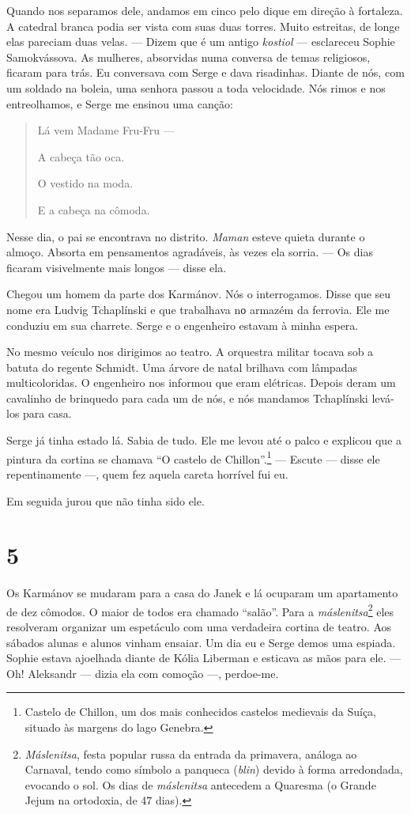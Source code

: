 Quando nos separamos dele, andamos em cinco pelo dique em direção à
fortaleza. A catedral branca podia ser vista com suas duas torres. Muito
estreitas, de longe elas pareciam duas velas. --- Dizem que é um antigo
\emph{kostiol} --- esclareceu Sophie Samokvássova. As mulheres,
absorvidas numa conversa de temas religiosos, ficaram para trás. Eu
conversava com Serge e dava risadinhas. Diante de nós, com um soldado na
boleia, uma senhora passou a toda velocidade. Nós rimos e nos
entreolhamos, e Serge me ensinou uma canção:

\begin{quotation}
Lá vem Madame Fru-Fru ---

A cabeça tão oca.

O vestido na moda.

E a cabeça na cômoda.
\end{quotation}

Nesse dia, o pai se encontrava no distrito. \emph{Maman} esteve quieta
durante o almoço. Absorta em pensamentos agradáveis, às vezes ela
sorria. --- Os dias ficaram visivelmente mais longos --- disse ela.

Chegou um homem da parte dos Karmánov. Nós o interrogamos. Disse que seu
nome era Ludvig Tchaplínski e que trabalhava nо armazém da ferrovia. Ele
me conduziu em sua charrete. Serge e o engenheiro estavam à minha
espera.

No mesmo veículo nos dirigimos ao teatro. A orquestra militar tocava sob
a batuta do regente Schmidt. Uma árvore de natal brilhava com lâmpadas
multicoloridas. O engenheiro nos informou que eram elétricas. Depois
deram um cavalinho de brinquedo para cada um de nós, e nós mandamos
Tchaplínski levá-los para casa.

Serge já tinha estado lá. Sabia de tudo. Ele me levou até o palco e
explicou que a pintura da cortina se chamava ``O castelo de
Chillon''.\footnote{Castelo de Chillon, um dos mais conhecidos castelos
  medievais da Suíça, situado às margens do lago Genebra.} --- Escute
--- disse ele repentinamente ---, quem fez aquela careta horrível fui
eu.

Em seguida jurou que não tinha sido ele.

\section{5}

Os Karmánov se mudaram para a casa do Janek e lá ocuparam um apartamento
de dez cômodos. O maior de todos era chamado ``salão''. Para a
\emph{máslenitsa}\footnote{\emph{Máslenitsa}, festa popular russa da
  entrada da primavera, análoga ao Carnaval, tendo como símbolo a
  panqueca (\emph{blin}) devido à forma arredondada, evocando o sol. Os
  dias de \emph{máslenitsa} antecedem a Quaresma (o Grande Jejum na
  ortodoxia, de 47 dias).} eles resolveram organizar um espetáculo com
uma verdadeira cortina de teatro. Aos sábados alunas e alunos vinham
ensaiar. Um dia eu e Serge demos uma espiada. Sophie estava ajoelhada
diante de Kólia Liberman e esticava as mãos para ele. --- Oh! Aleksandr
--- dizia ela com comoção ---, perdoe-me.

